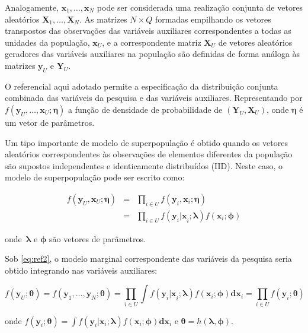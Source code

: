 \documentclass[]{book}
\numberwithin{example}{chapter}
\numberwithin{remark}{chapter}
\numberwithin{definition}{chapter}
\begin{document}
Analogamente, \(\mathbf{x}_1 ,\ldots, \mathbf{x}_N\) pode ser
considerada uma realização conjunta de vetores aleatórios
\(\mathbf{X}_1 ,\ldots, \mathbf{X}_N\). As matrizes \(N \times Q\)
formadas empilhando os vetores transpostos das observações das variáveis
auxiliares correspondentes a todas as unidades da população,
\(\mathbf{x}_{U}\), e a correspondente matriz \(\mathbf{X}_{U}\) de
vetores aleatórios geradores das variáveis auxiliares na população são
definidas de forma análoga às matrizes \(\mathbf{y}_{U}\) e
\(\mathbf{Y}_{U}\).

O referencial aqui adotado permite a especificação da distribuição
conjunta combinada das variáveis da pesquisa e das variáveis auxiliares.
Representando por
\(f( \mathbf{y}_U ,\ldots, \mathbf{x}_U ; \mathbf{\eta} )\) a função de
densidade de probabilidade de \(( \mathbf{Y}_U , \mathbf{X}_U )\), onde
\(\mathbf{\eta}\) é um vetor de parâmetros.

Um tipo importante de modelo de superpopulação é obtido quando os
vetores aleatórios correspondentes às observações de elementos
diferentes da população são supostos independentes e identicamente
distribuídos (IID). Neste caso, o modelo de superpopulação pode ser
escrito como:

\begin{eqnarray}
f \left( \mathbf{y}_U , \mathbf{x}_U ; \mathbf{\eta} \right) 
&=&\prod_{i\in U} f\left(\mathbf{y}_i , \mathbf{x}_i ; \mathbf{\eta} \right) \label{eq:ref1} \\
&=&\prod_{i\in U} f\left( \mathbf{y}_i \mathbf{|x}_i ; \mathbf{\lambda} \right) 
f\left( \mathbf{x}_i ; \mathbf{\phi} \right) \label{eq:ref2}
\end{eqnarray}

onde~\(\mathbf{\lambda}\) e \(\mathbf{\phi}\) são vetores de parâmetros.

Sob \eqref{eq:ref2}, o modelo marginal correspondente das variáveis da
pesquisa seria obtido integrando nas variáveis auxiliares:

\begin{equation}
f(\mathbf{y}_U ; \mathbf{\theta}) = f(\mathbf{y}_1 ,\ldots ,\mathbf{y}_N ; \mathbf{\theta}) = \prod_{i\in U} \int f\left( \mathbf{y}_i \mathbf{|x}_i ; \mathbf{\lambda} \right) f\left( \mathbf{x}_i ; \mathbf{\phi} \right) \mathbf{dx}_i = \prod_{i\in U} f\left( \mathbf{y}_i ; \mathbf{\theta} \right) \label{eq:ref3}
\end{equation}

onde
\(f\left( \mathbf{y}_i ; \mathbf{\theta} \right) = \int f\left( \mathbf{y}_i | \mathbf{x}_i ; \mathbf{\lambda} \right) f\left( \mathbf{x}_i ; \mathbf{\phi} \right) \mathbf{dx}_i\)
e
\(\mathbf{\theta =} h\left( \mathbf{\lambda} , \mathbf{\phi} \right)\).
\end{document}
